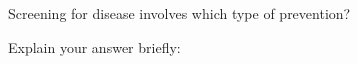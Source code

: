 
Screening for disease involves which type of prevention?
\begin{MultipleChoice}
\end{MultipleChoice}

Explain your answer briefly:
\TextEntry